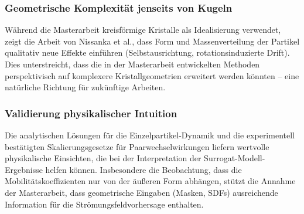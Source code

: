 \documentclass[a4paper,12pt]{article}
\begin{document}
\subsubsection*{Geometrische Komplexität jenseits von Kugeln}
Während die Masterarbeit kreisförmige Kristalle als Idealisierung verwendet, zeigt die Arbeit von Nissanka et al., dass Form und Massenverteilung der Partikel qualitativ neue Effekte einführen (Selbstausrichtung, rotationsinduzierte Drift). Dies unterstreicht, dass die in der Masterarbeit entwickelten Methoden perspektivisch auf komplexere Kristallgeometrien erweitert werden könnten -- eine natürliche Richtung für zukünftige Arbeiten.

\subsubsection*{Validierung physikalischer Intuition}
Die analytischen Lösungen für die Einzelpartikel-Dynamik und die experimentell bestätigten Skalierungsgesetze für Paarwechselwirkungen liefern wertvolle physikalische Einsichten, die bei der Interpretation der Surrogat-Modell-Ergebnisse helfen können. Insbesondere die Beobachtung, dass die Mobilitätskoeffizienten nur von der äußeren Form abhängen, stützt die Annahme der Masterarbeit, dass geometrische Eingaben (Masken, SDFs) ausreichende Information für die Strömungsfeldvorhersage enthalten.
\end{document}
